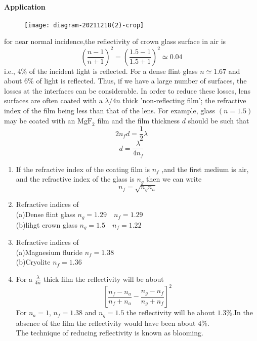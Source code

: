 \paragraph{Application}
\begin{figure}[H]
	\centering
	\texttt{[image: diagram-20211218(2)-crop]}
	\caption{}
	\label{}
\end{figure}
for near normal incidence,the reflectivity of crown glass surface in air is
$$
\left(\frac{n-1}{n+1}\right)^{2}=\left(\frac{1.5-1}{1.5+1}\right)^{2} \simeq 0.04
$$
i.e., $4 \%$ of the incident light is reflected. For a dense flint glass $n \simeq 1.67$ and about $6 \%$ of light is reflected. Thus, if we  have a large number of surfaces, the losses at the interfaces can be considerable. In order to reduce these losses, lens surfaces are often coated with a $\lambda / 4 n$ thick 'non-reflecting film'; the refractive index of the film being less than that of the lens. For example, glass $(n=1.5)$ may be coated with an $\mathrm{MgF}_{2}$ film and the film thickness $d$ should be such that\\
$$2n_fd=\frac{1}{2}\lambda$$
$$d=\frac{\lambda}{4n_f}$$
\begin{note}
	\begin{enumerate}
		\item If the refractive index of the coating film is $n_f$ ,and the first medium is air, and the refractive index of the glass is $n_g$ then we can write 
		$$ n_f=\sqrt{n_gn_a}$$
		\item Refractive indices of\\
		(a)Dense flint glass $n_g=1.29 \quad n_f=1.29$\\
		(b)lihgt crown glass $n_g=1.5 \quad n_f=1.22$
		\item Refractive indices of \\
		(a)Magnesium fluride $n_f=1.38$\\
		(b)Cryolite $n_f=1.36$
		\item For a $\frac{\lambda}{4n}$ thick film the reflectivity will be about 
		$$\left[ \frac{n_f-n_a}{n_f+n_a}-\frac{n_g-n_f}{n_g+n_f}\right] ^2$$
		For $n_a=1$, $n_f=1.38$ and $n_g=1.5$ the reflectivity will be about $1.3\%$.In the absence of the film the reflectivity would have been about $4\%$.\\
		The technique of reducing reflectivity is known as blooming.
	\end{enumerate}
\end{note}
